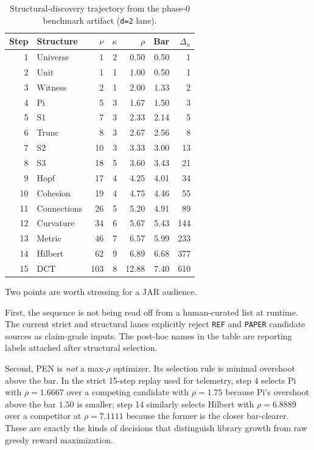 \documentclass[11pt,a4paper]{article}
\begin{document}
\begin{table}[p]
\centering
\caption{Structural-discovery trajectory from the phase-0 benchmark artifact (\texttt{d=2} lane).}
\label{tab:trajectory}
\small
\begin{tabular}{@{}r l r r r r r@{}}
\toprule
Step & Structure & $\nu$ & $\kappa$ & $\rho$ & Bar & $\Delta_n$ \\
\midrule
1  & Universe    & 1   & 2 & 0.50 & 0.50 & 1 \\
2  & Unit        & 1   & 1 & 1.00 & 0.50 & 1 \\
3  & Witness     & 2   & 1 & 2.00 & 1.33 & 2 \\
4  & Pi          & 5   & 3 & 1.67 & 1.50 & 3 \\
5  & S1          & 7   & 3 & 2.33 & 2.14 & 5 \\
6  & Trunc       & 8   & 3 & 2.67 & 2.56 & 8 \\
7  & S2          & 10  & 3 & 3.33 & 3.00 & 13 \\
8  & S3          & 18  & 5 & 3.60 & 3.43 & 21 \\
9  & Hopf        & 17  & 4 & 4.25 & 4.01 & 34 \\
10 & Cohesion    & 19  & 4 & 4.75 & 4.46 & 55 \\
11 & Connections & 26  & 5 & 5.20 & 4.91 & 89 \\
12 & Curvature   & 34  & 6 & 5.67 & 5.43 & 144 \\
13 & Metric      & 46  & 7 & 6.57 & 5.99 & 233 \\
14 & Hilbert     & 62  & 9 & 6.89 & 6.68 & 377 \\
15 & DCT         & 103 & 8 & 12.88 & 7.40 & 610 \\
\bottomrule
\end{tabular}
\end{table}

Two points are worth stressing for a JAR audience.

First, the sequence is not being read off from a human-curated list at runtime. The current strict and structural lanes explicitly reject \texttt{REF} and \texttt{PAPER} candidate sources as claim-grade inputs. The post-hoc names in the table are reporting labels attached after structural selection.

Second, PEN is \emph{not} a max-$\rho$ optimizer. Its selection rule is minimal overshoot above the bar. In the strict 15-step replay used for telemetry, step 4 selects Pi with $\rho=1.6667$ over a competing candidate with $\rho=1.75$ because Pi's overshoot above the bar $1.50$ is smaller; step 14 similarly selects Hilbert with $\rho=6.8889$ over a competitor at $\rho=7.1111$ because the former is the closer bar-clearer. These are exactly the kinds of decisions that distinguish library growth from raw greedy reward maximization.
\end{document}
